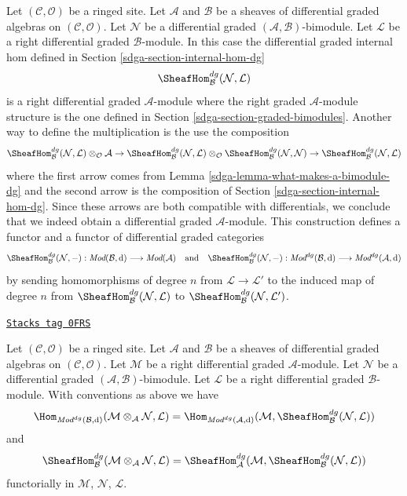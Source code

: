 \medskip\noindent
Let $(\mathcal{C}, \mathcal{O})$ be a ringed site. Let $\mathcal{A}$
and $\mathcal{B}$ be a sheaves of differential graded algebras on
$(\mathcal{C}, \mathcal{O})$. Let $\mathcal{N}$ be a
differential graded $(\mathcal{A}, \mathcal{B})$-bimodule. Let
$\mathcal{L}$ be a right differential graded $\mathcal{B}$-module.
In this case the differential graded internal hom
defined in Section \ref{sdga-section-internal-hom-dg}
$$
\SheafHom_\mathcal{B}^{dg}(\mathcal{N}, \mathcal{L})
$$
is a right differential graded $\mathcal{A}$-module where the
right graded $\mathcal{A}$-module structure is the one defined
in Section \ref{sdga-section-graded-bimodules}. Another way to define
the multiplication is the use the composition
$$
\SheafHom_\mathcal{B}^{dg}(\mathcal{N}, \mathcal{L})
\otimes_\mathcal{O} \mathcal{A}
\to
\SheafHom_\mathcal{B}^{dg}(\mathcal{N}, \mathcal{L})
\otimes_\mathcal{O} \SheafHom_\mathcal{B}^{dg}(\mathcal{N}, \mathcal{N})
\to
\SheafHom_\mathcal{B}^{dg}(\mathcal{N}, \mathcal{L})
$$
where the first arrow comes from Lemma \ref{sdga-lemma-what-makes-a-bimodule-dg}
and the second arrow is the composition of
Section \ref{sdga-section-internal-hom-dg}. Since these arrows are
both compatible with differentials, we conclude that we indeed
obtain a differential graded $\mathcal{A}$-module.
This construction
defines a functor and a functor of differential graded categories
$$
\SheafHom_\mathcal{B}^{dg}(\mathcal{N}, -) :
\textit{Mod}(\mathcal{B}, \text{d})
\longrightarrow
\textit{Mod}(\mathcal{A})
\quad\text{and}\quad
\SheafHom_\mathcal{B}^{dg}(\mathcal{N}, -) :
\textit{Mod}^{dg}(\mathcal{B}, \text{d})
\longrightarrow
\textit{Mod}^{dg}(\mathcal{A}, \text{d})
$$
by sending homomorphisms of degree $n$ from $\mathcal{L} \to \mathcal{L}'$
to the induced map of degree $n$ from
$\SheafHom_\mathcal{B}^{dg}(\mathcal{N}, \mathcal{L})$ to
$\SheafHom_\mathcal{B}^{dg}(\mathcal{N}, \mathcal{L}')$.

\begin{lemma}
\label{sdga-lemma-tensor-hom-adjunction-dg}
\href{https://stacks.math.columbia.edu/tag/0FRS}{\texttt{Stacks tag 0FRS}}

Let $(\mathcal{C}, \mathcal{O})$ be a ringed site. Let $\mathcal{A}$
and $\mathcal{B}$ be a sheaves of differential graded algebras on
$(\mathcal{C}, \mathcal{O})$. Let $\mathcal{M}$ be a right
differential graded $\mathcal{A}$-module. Let $\mathcal{N}$ be a
differential graded $(\mathcal{A}, \mathcal{B})$-bimodule. Let $\mathcal{L}$
be a right differential graded $\mathcal{B}$-module. With conventions as above
we have
$$
\Hom_{\textit{Mod}^{dg}(\mathcal{B}, \text{d})}(
\mathcal{M} \otimes_\mathcal{A} \mathcal{N}, \mathcal{L}) =
\Hom_{\textit{Mod}^{dg}(\mathcal{A}, \text{d})}(
\mathcal{M}, \SheafHom_\mathcal{B}^{dg}(\mathcal{N}, \mathcal{L}))
$$
and
$$
\SheafHom_\mathcal{B}^{dg}(
\mathcal{M} \otimes_\mathcal{A} \mathcal{N}, \mathcal{L}) =
\SheafHom_\mathcal{A}^{dg}(
\mathcal{M}, \SheafHom_\mathcal{B}^{dg}(\mathcal{N}, \mathcal{L}))
$$
functorially in $\mathcal{M}$, $\mathcal{N}$, $\mathcal{L}$.
\end{lemma}

